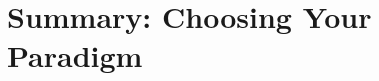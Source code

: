 \documentclass[aspectratio=169]{beamer}
\newif\ifanimated
\newcommand{\cpause}{\ifanimated\pause\fi}
\begin{document}






\section{Summary: Choosing Your Paradigm}

\begin{frame}[plain]
\sectionpage
\end{frame}
\end{document}
